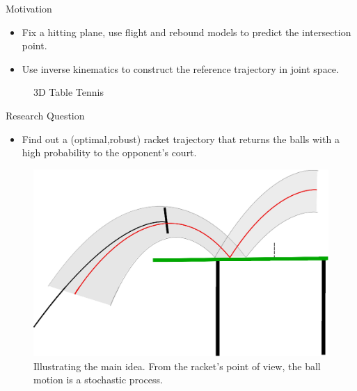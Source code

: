 \documentclass[handout]{beamer}
\begin{document}
\begin{frame}{Motivation}
\begin{itemize}
\item Fix a hitting plane, use flight and rebound models to predict the intersection point. 
\item Use inverse kinematics to construct the reference trajectory in joint space.
\end{itemize}
\begin{figure}[t!]
\center
\caption{3D Table Tennis}
\label{robot2}
\end{figure}
\end{frame}
%
\begin{frame}{Research Question}
\begin{itemize}
\item Find out a (optimal,robust) racket trajectory that returns the balls with a high probability to the opponent's court.
\end{itemize}
\begin{figure}[t!]
\centering
\includegraphics[scale=0.4]{drawing.eps}			
\caption{Illustrating the main idea. From the racket's point of view, the ball motion is a stochastic process.}
\label{mainIdea}
\end{figure}
\end{frame}
%
\end{document}

